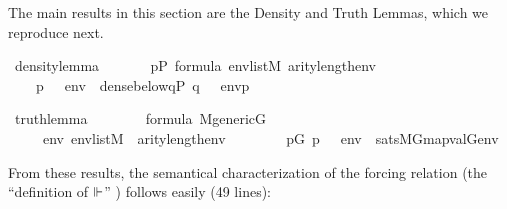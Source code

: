 The main results in this section are the Density and Truth Lemmas,
which we reproduce next.
%
\begin{isabelle}
\isamarkupfalse%
\ density{\isacharunderscore}lemma{\isacharcolon}\isanewline
\ \ \isanewline
\ \ \ \ {\isachardoublequoteopen}p{\isasymin}P{\isachardoublequoteclose}\ {\isachardoublequoteopen}{\isasymphi}{\isasymin}formula{\isachardoublequoteclose}\ {\isachardoublequoteopen}env{\isasymin}list{\isacharparenleft}M{\isacharparenright}{\isachardoublequoteclose}\ {\isachardoublequoteopen}arity{\isacharparenleft}{\isasymphi}{\isacharparenright}{\isasymle}length{\isacharparenleft}env{\isacharparenright}{\isachardoublequoteclose}\isanewline
\ \ \isanewline
\ \ \ \ {\isachardoublequoteopen}{\isacharparenleft}p\ {\isasymtturnstile}\ {\isasymphi}\ env{\isacharparenright}\ {\isasymlongleftrightarrow}\ dense{\isacharunderscore}below{\isacharparenleft}{\isacharbraceleft}q{\isasymin}P{\isachardot}\ {\isacharparenleft}q\ {\isasymtturnstile}\ {\isasymphi}\ env{\isacharparenright}{\isacharbraceright}{\isacharcomma}p{\isacharparenright}{\isachardoublequoteclose}
\end{isabelle}
\begin{isabelle}
\isamarkupfalse%
\ truth{\isacharunderscore}lemma{\isacharcolon}\isanewline
\ \ \ \isanewline
\ \ \ \ {\isachardoublequoteopen}{\isasymphi}{\isasymin}formula{\isachardoublequoteclose}\ {\isachardoublequoteopen}M{\isacharunderscore}generic{\isacharparenleft}G{\isacharparenright}{\isachardoublequoteclose}\isanewline
\ \ \ \isanewline
\ \ \ \ \ {\isachardoublequoteopen}{\isasymAnd}env{\isachardot}\ env{\isasymin}list{\isacharparenleft}M{\isacharparenright}\ {\isasymLongrightarrow}\ arity{\isacharparenleft}{\isasymphi}{\isacharparenright}{\isasymle}length{\isacharparenleft}env{\isacharparenright}\ {\isasymLongrightarrow}\ \isanewline
\ \ \ \ \ \ {\isacharparenleft}{\isasymexists}p{\isasymin}G{\isachardot}\ {\isacharparenleft}p\ {\isasymtturnstile}\ {\isasymphi}\ env{\isacharparenright}{\isacharparenright}\ {\isasymlongleftrightarrow}\ sats{\isacharparenleft}M{\isacharbrackleft}G{\isacharbrackright}{\isacharcomma}{\isasymphi}{\isacharcomma}map{\isacharparenleft}val{\isacharparenleft}G{\isacharparenright}{\isacharcomma}env{\isacharparenright}{\isacharparenright}{\isachardoublequoteclose}
\end{isabelle}
%
From these results, the semantical characterization of the forcing
relation (the ``definition of $\Vdash$''
\cite[IV.2.22]{kunen2011set}) follows easily (49 lines):
